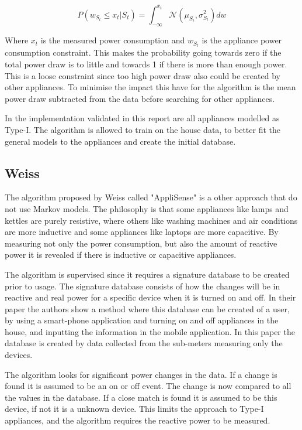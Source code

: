 \begin{equation}
	P(w_{S_t} \leq x_t | S_t ) = \int_{-\infty}^{x_t}  \mathcal{N}( \mu_{S_t} , \sigma_{S_t}^2 ) dw
	\label{EQ:PCA}
\end{equation}

Where $x_t$ is the measured power consumption and $w_{S_t}$ is the appliance power consumption constraint. This makes the probability going towards zero if the total power draw is to little and towards 1 if there is more than enough power. This is a loose constraint since too high power draw also could be created by other appliances. To minimise the impact this have for the algorithm is the mean power draw subtracted from the data before searching for other appliances. 

In the implementation validated in this report are all appliances modelled as Type-I. The algorithm is allowed to train on the house data, to better fit the general models to the appliances and create the initial database.

\subsection{Weiss}
The algorithm proposed by Weiss called "AppliSense" is a other approach that do not use Markov models\citep{RefWorks:23}. The philosophy is that some appliances like lamps and kettles are purely resistive, where others like washing machines and air conditions are more inductive and some appliances like laptops are more capacitive. By measuring not only the power consumption, but also the amount of reactive power it is revealed if there is inductive or capacitive appliances.

The algorithm is supervised since it requires a signature database to be created prior to usage. The signature database consists of how the changes will be in reactive and real power for a specific device when it is turned on and off. In their paper the authors show a method where this database can be created of a user, by using a smart-phone application and turning on and off appliances in the house, and inputting the information in the mobile application\citep{RefWorks:23}. In this paper the database is created by data collected from the sub-meters measuring only the devices.  

The algorithm looks for significant power changes in the data. If a change is found it is assumed to be an on or off event. The change is now compared to all the values in the database. If a close match is found it is assumed to be this device, if not it is a unknown device. This limits the approach to Type-I appliances, and the algorithm requires the reactive power to be measured. 

